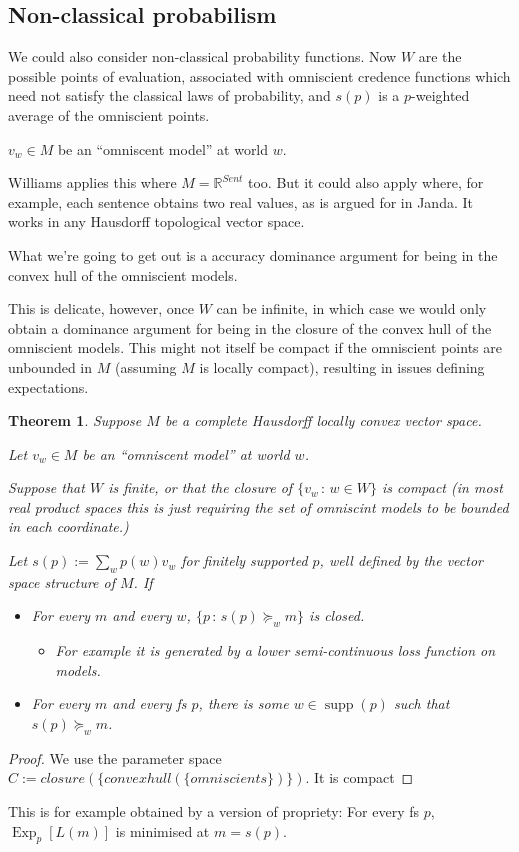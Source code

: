 \documentclass[11pt]{article}
\newtheorem{theorem}{Theorem}[section]
\theoremstyle{definition}
\theoremstyle{remark}
\newcommand{\R}{\mathbb R}
\newcommand{\supp}{\operatorname{supp}}
\newcommand{\Exp}{\operatorname{Exp}}
\newcommand{\given}{\,:\,}
\begin{document}
\subsection{Non-classical probabilism}
We could also consider non-classical probability functions. Now $W$ are the possible points of evaluation, associated with omniscient credence functions which need not satisfy the classical laws of probability, and $s(p)$ is a $p$-weighted average of the omniscient points. 

$v_w\in M$ be an ``omniscent model'' at world $w$. 

Williams applies this where $M=\R^{Sent}$ too. But it could also apply where, for example, each sentence obtains two real values, as is argued for in Janda. It works in any Hausdorff topological vector space. 

What we're going to get out is a accuracy dominance argument for being in the convex hull of the omniscient models. 

This is delicate, however, once $W$ can be infinite, in which case we would only obtain a dominance argument for being in the closure of the convex hull of the omniscient models. This might not itself be compact if the omniscient points are unbounded in $M$ (assuming $M$ is locally compact), resulting in issues defining expectations. 


\begin{theorem}
	Suppose $M$ be a complete Hausdorff locally convex vector space. 
	
	Let $v_w\in M$ be an ``omniscent model'' at world $w$. 
	
	Suppose that $W$ is finite, or that the closure of $\{v_w\given w \in W\}$ is compact (in most real product spaces this is just requiring the set of omniscint models to be bounded in each coordinate.)
	
	Let $s(p):=\sum_w p(w) v_w$ for finitely supported $p$, well defined by the vector space structure of $M$.
	If \begin{itemize}
		\item For every $m$ and every $w$, $\{p\given s(p)\succeq_w m\}$ is closed. \begin{itemize}
			\item For example it is generated by a lower semi-continuous loss function on models. 
		\end{itemize}
		\item For every $m$ and every fs $p$, there is some $w\in\supp(p)$ such that $s(p)\succeq_w m$. 
	\end{itemize}
\end{theorem}
\begin{proof}
	We use the parameter space $C:=closure(\{convexhull(\{omniscients\})\})$. It is compact 
\end{proof}
This is for example obtained by a version of propriety: For every fs $p$, $\Exp_p[L(m)]$ is minimised at $m=s(p)$. 
\end{document}

